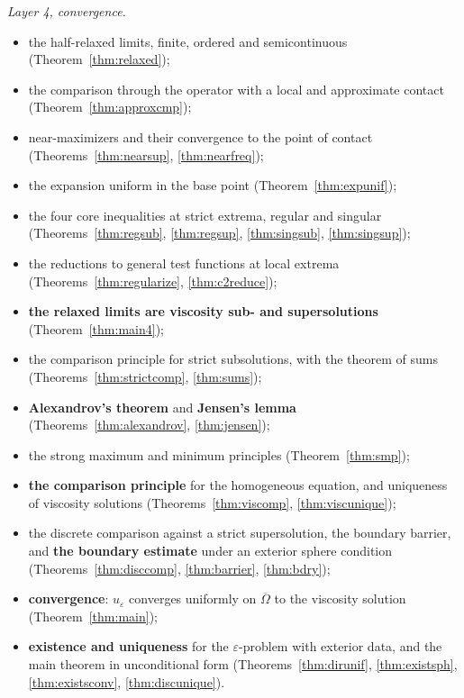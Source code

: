 \documentclass[11pt,reqno]{amsart}
\newcommand{\eps}{\varepsilon}
\theoremstyle{plain}
\theoremstyle{definition}
\begin{document}
\emph{Layer 4, convergence.}
\begin{itemize}
  \item the half-relaxed limits, finite, ordered and semicontinuous
        (Theorem~\ref{thm:relaxed});
  \item the comparison through the operator with a local and approximate
        contact (Theorem~\ref{thm:approxcmp});
  \item near-maximizers and their convergence to the point of contact
        (Theorems~\ref{thm:nearsup}, \ref{thm:nearfreq});
  \item the expansion uniform in the base point (Theorem~\ref{thm:expunif});
  \item the four core inequalities at strict extrema, regular and singular
        (Theorems~\ref{thm:regsub}, \ref{thm:regsup}, \ref{thm:singsub},
        \ref{thm:singsup});
  \item the reductions to general test functions at local extrema
        (Theorems~\ref{thm:regularize}, \ref{thm:c2reduce});
  \item \textbf{the relaxed limits are viscosity sub- and supersolutions}
        (Theorem~\ref{thm:main4});
  \item the comparison principle for strict subsolutions, with the theorem
        of sums (Theorems~\ref{thm:strictcomp}, \ref{thm:sums});
  \item \textbf{Alexandrov's theorem} and \textbf{Jensen's lemma}
        (Theorems~\ref{thm:alexandrov}, \ref{thm:jensen});
  \item the strong maximum and minimum principles (Theorem~\ref{thm:smp});
  \item \textbf{the comparison principle} for the homogeneous equation, and
        uniqueness of viscosity solutions
        (Theorems~\ref{thm:viscomp}, \ref{thm:viscunique});
  \item the discrete comparison against a strict supersolution, the boundary
        barrier, and \textbf{the boundary estimate} under an exterior sphere
        condition (Theorems~\ref{thm:disccomp}, \ref{thm:barrier},
        \ref{thm:bdry});
  \item \textbf{convergence}: $u_\eps$ converges uniformly on
        $\overline\Omega$ to the viscosity solution (Theorem~\ref{thm:main});
  \item \textbf{existence and uniqueness} for the $\eps$-problem with
        exterior data, and the main theorem in unconditional form
        (Theorems~\ref{thm:dirunif}, \ref{thm:existsph},
        \ref{thm:existsconv}, \ref{thm:discunique}).
\end{itemize}
\end{document}
